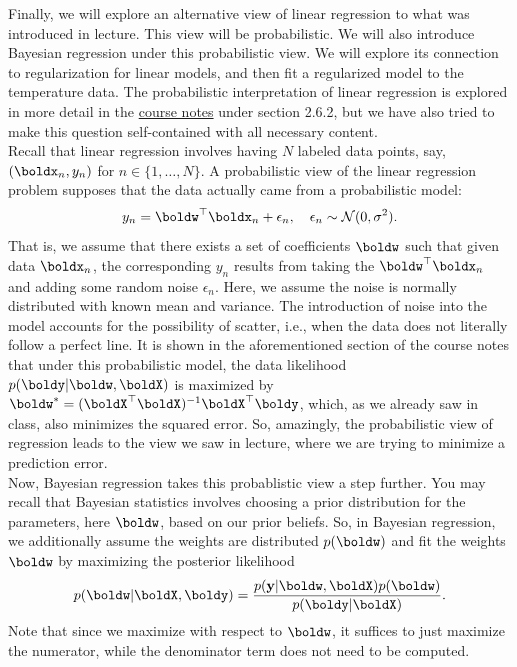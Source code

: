 \documentclass[submit]{harvardml}
\begin{document}
\begin{problem}
    Finally, we will explore an alternative view of linear regression to what was introduced in lecture. This view will be probabilistic. We will also introduce Bayesian regression under this probabilistic view. We will explore its connection to regularization for linear models, and then fit a regularized model to the temperature data. The probabilistic interpretation of linear regression is explored in more detail in the \href{https://github.com/harvard-ml-courses/cs181-textbook/blob/master/Textbook.pdf}{course notes} under section 2.6.2, but we have also tried to make this question self-contained with all necessary content.
    \\
    
    \noindent Recall that linear regression involves having $N$ labeled data points, say, $(\boldx_n,y_n)$ for $n\in\{1,\dots,N\}$. A probabilistic view of the linear regression problem supposes that the data actually came from a probabilistic model:
    \[y_n = \boldw^\top\boldx_n + \epsilon_n, \quad \epsilon_n \sim \mathcal{N}(0, \sigma^2).\]
    That is, we assume that there exists a set of coefficients $\boldw$ such that given data $\boldx_n$, the corresponding $y_n$ results from taking the $\boldw^\top\boldx_n$ and adding some random noise $\epsilon_n$. Here, we assume the noise is normally distributed with known mean and variance. The introduction of noise into the model accounts for the possibility of scatter, i.e., when the data does not literally follow a perfect line. It is shown in the aforementioned section of the course notes that under this probabilistic model, the data likelihood $p(\boldy|\boldw,\boldX)$ is maximized by $\boldw^* = (\boldX^\top\boldX)^{-1} \boldX^\top \boldy$, which, as we already saw in class, also minimizes the squared error. So, amazingly, the probabilistic view of regression leads to the view we saw in lecture, where we are trying to minimize a prediction error. \\
    
    \noindent Now, Bayesian regression takes this probablistic view a step further. You may recall that Bayesian statistics involves choosing a prior distribution for the parameters, here $\boldw$, based on our prior beliefs. So, in Bayesian regression, we additionally assume the weights are distributed $p(\boldw)$ and fit the weights $\boldw$ by maximizing the posterior likelihood
    \[ p(\boldw | \boldX, \boldy) = \frac{p(\bold y | \boldw, \boldX)p(\boldw)}{p(\boldy | \boldX)}. \]
    Note that since we maximize with respect to $\boldw$, it suffices to just maximize the numerator, while the denominator term does not need to be computed.
    

\end{problem}
\end{document}
